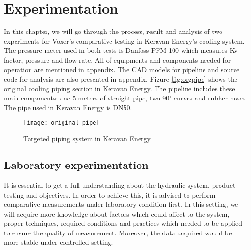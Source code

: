 
\chapter{Experimentation}
In this chapter, we will go through the process, result and analysis of two experiments for Voxer's comparative testing in Keravan Energy's cooling system. The pressure meter used in both tests is Danfoss PFM 100 \cite{danfoss:web} which measures Kv factor, pressure and flow rate. All of equipments and components needed for operation are mentioned in appendix. The CAD models for pipeline and source code for analysis are also presented in appendix. Figure \vref{fig:orgpipe} shows the original cooling piping section in Keravan Energy. The pipeline includes these main components: one 5 meters of straight pipe, two 90$^{\circ}$ curves and rubber hoses. The pipe used in Keravan Energy is DN50.
\begin{figure}[h]
  \centering
  \texttt{[image: original\_pipe]}
  \caption{ Targeted piping system in Keravan Energy}
  \label{fig:orgpipe}
\end{figure}
\section{Laboratory experimentation}
It is essential to get a full understanding about the hydraulic system, product testing and objectives. In order to achieve this, it is advised to perform comparative measurements under laboratory condition first. In this setting, we will acquire more knowledge about factors which could affect to the system, proper techniques, required conditions and practices which needed to be applied to ensure the quality of measurement. Moreover, the data acquired would be more stable under controlled setting.
